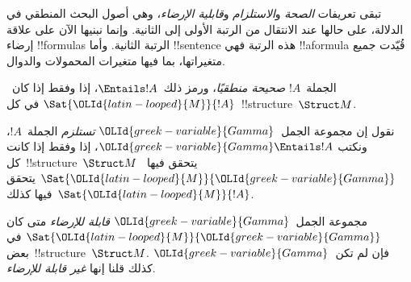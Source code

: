 \documentclass[../../../include/open-logic-section]{subfiles}
\begin{document}

\begin{explain}
تبقى تعريفات \emph{الصحة} و\emph{الاستلزام} و\emph{قابلية الإرضاء}،
وهي أصول البحث المنطقي في الدلالة، على حالها عند الانتقال من الرتبة
الأولى إلى الثانية. وإنما نبنيها الآن على علاقة إرضاء !!{formula}s
الرتبة الثانية. وأما !!{sentence} هذه الرتبة فهي
!!a{formula} قُيّدت جميع متغيراتها، بما فيها متغيرات المحمولات
والدوال.
\end{explain}

\begin{defn}[الصحة]
الجملة~$!A$ \emph{صحيحة منطقيًا}، ورمز ذلك~$\Entails !A$، إذا
وفقط إذا كان~$\Sat{\OLId{latin-looped}{M}}{!A}$ في كل~!!{structure}~$\Struct M$.
\end{defn}

\begin{defn}[الاستلزام]
نقول إن مجموعة الجمل~$\OLId{greek-variable}{Gamma}$ \emph{تستلزم} الجملة~$!A$، ونكتب
$\OLId{greek-variable}{Gamma} \Entails !A$، إذا وفقط إذا كانت كل~!!{structure}~$\Struct M$
يتحقق فيها~$\Sat{\OLId{latin-looped}{M}}{\OLId{greek-variable}{Gamma}}$ يتحقق فيها كذلك~$\Sat{\OLId{latin-looped}{M}}{!A}$.
\end{defn}

\begin{defn}
مجموعة الجمل~$\OLId{greek-variable}{Gamma}$ \emph{قابلة للإرضاء} متى كان
$\Sat{\OLId{latin-looped}{M}}{\OLId{greek-variable}{Gamma}}$ في بعض~!!{structure}~$\Struct M$.
فإن لم تكن~$\OLId{greek-variable}{Gamma}$ كذلك قلنا إنها \emph{غير قابلة للإرضاء}.
\end{defn}
\end{document}
